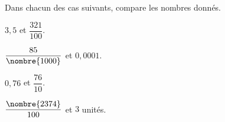 Dans chacun des cas suivants, compare les nombres donnés.
\begin{multicols}{2}
\begin{myenumerate}
  \item $3,5$ et $\dfrac{321}{100}$.
  \item $\dfrac{85}{\nombre{1000}}$ et $0,0001$.
  \item $0,76$ et $\dfrac{76}{10}$.
  \item $\dfrac{\nombre{2374}}{100}$ et $3$ unités.
\end{myenumerate}
\end{multicols}